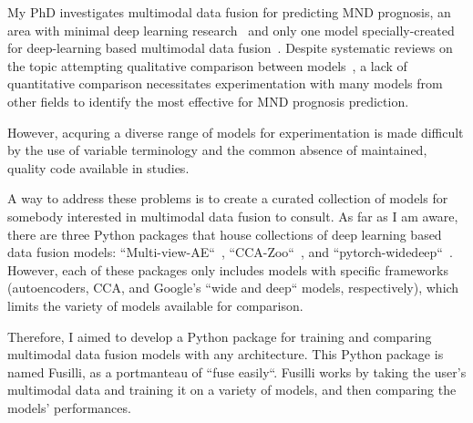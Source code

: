 My PhD investigates multimodal data fusion for predicting MND prognosis, an area with minimal deep learning research~\cite{pancottiDeepLearningMethods2022, mullerExplainableModelsDisease2021} and only one model specially-created for deep-learning based multimodal data fusion~\cite{vanderburghDeepLearningPredictions2017}.
Despite systematic reviews on the topic attempting qualitative comparison between models~\cite{cuiDeepMultimodalFusion2022, gaoSurveyDeepLearning2020, stahlschmidtMultimodalDeepLearning2022, yanDeepMultiviewLearning2021}, a lack of quantitative comparison necessitates experimentation with many models from other fields to identify the most effective for MND prognosis prediction.

However, acquring a diverse range of models for experimentation is made difficult by the use of variable terminology and the common absence of maintained, quality code available in studies.

A way to address these problems is to create a curated collection of models for somebody interested in multimodal data fusion to consult.
As far as I am aware, there are three Python packages that house collections of deep learning based data fusion models: ``Multi-view-AE``~\cite{aguilaMultiviewAEPythonPackage2023}, ``CCA-Zoo``~\cite{chapmanCCAZooCollectionRegularized2021}, and ``pytorch-widedeep``~\cite{zaurinPytorchwidedeepFlexiblePackage2023}.
However, each of these packages only includes models with specific frameworks (autoencoders, CCA, and Google's ``wide and deep`` models, respectively), which limits the variety of models available for comparison.

Therefore, I aimed to develop a Python package for training and comparing multimodal data fusion models with any architecture.
This Python package is named Fusilli, as a portmanteau of ``fuse easily``.
Fusilli works by taking the user's multimodal data and training it on a variety of models, and then comparing the models' performances.

